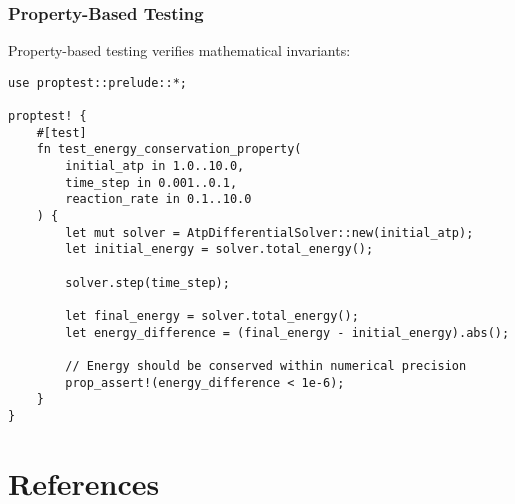 \documentclass[12pt,a4paper]{article}
\begin{document}
\subsubsection{Property-Based Testing}

Property-based testing verifies mathematical invariants:

\begin{lstlisting}[style=ruststyle]
use proptest::prelude::*;

proptest! {
    #[test]
    fn test_energy_conservation_property(
        initial_atp in 1.0..10.0,
        time_step in 0.001..0.1,
        reaction_rate in 0.1..10.0
    ) {
        let mut solver = AtpDifferentialSolver::new(initial_atp);
        let initial_energy = solver.total_energy();
        
        solver.step(time_step);
        
        let final_energy = solver.total_energy();
        let energy_difference = (final_energy - initial_energy).abs();
        
        // Energy should be conserved within numerical precision
        prop_assert!(energy_difference < 1e-6);
    }
}
\end{lstlisting}

\section{References}
\end{document}

